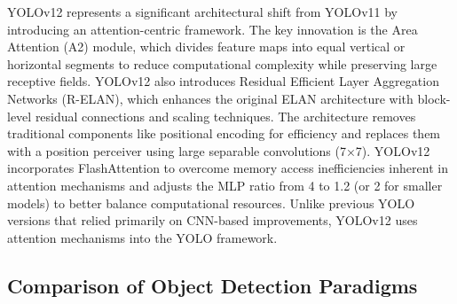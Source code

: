 \documentclass[12pt, a4paper]{article}
\begin{document}
YOLOv12 \cite{yolov12} represents a significant architectural shift from YOLOv11 by introducing an attention-centric framework. The key innovation is the Area Attention (A2) module, which divides feature maps into equal vertical or horizontal segments to reduce computational complexity while preserving large receptive fields. YOLOv12 also introduces Residual Efficient Layer Aggregation Networks (R-ELAN), which enhances the original ELAN architecture with block-level residual connections and scaling techniques. The architecture removes traditional components like positional encoding for efficiency and replaces them with a position perceiver using large separable convolutions (7×7). YOLOv12 incorporates FlashAttention to overcome memory access inefficiencies inherent in attention mechanisms and adjusts the MLP ratio from 4 to 1.2 (or 2 for smaller models) to better balance computational resources. Unlike previous YOLO versions that relied primarily on CNN-based improvements, YOLOv12 uses attention mechanisms into the YOLO framework.


\subsection{Comparison of Object Detection Paradigms}
\end{document}
